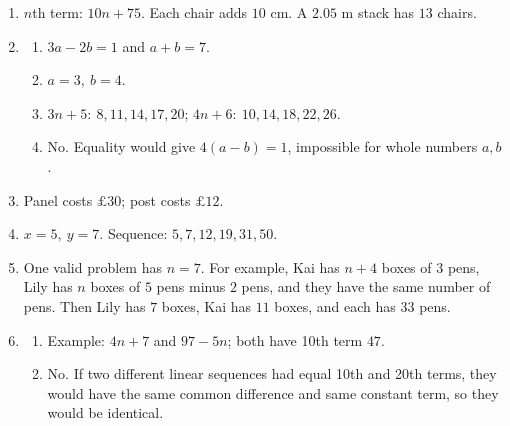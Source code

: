 \documentclass[11pt,a4paper]{article}
\begin{document}
\begin{enumerate}[leftmargin=*,label=\textbf{Q\arabic*.}]
\item \(n\)th term: \(10n+75\). Each chair adds \(10\) cm. A \(2.05\) m stack has \(13\) chairs.

\item
\begin{enumerate}[label=(\alph*)]
\item \(3a-2b=1\) and \(a+b=7\).
\item \(a=3,\ b=4\).
\item \(3n+5:\ 8,11,14,17,20\); \quad \(4n+6:\ 10,14,18,22,26\).
\item No. Equality would give \(4(a-b)=1\), impossible for whole numbers \(a,b\).
\end{enumerate}

\item Panel costs \(\pounds30\); post costs \(\pounds12\).

\item \(x=5,\ y=7\). Sequence: \(5,7,12,19,31,50\).

\item One valid problem has \(n=7\). For example, Kai has \(n+4\) boxes of \(3\) pens, Lily has \(n\) boxes of \(5\) pens minus \(2\) pens, and they have the same number of pens. Then Lily has \(7\) boxes, Kai has \(11\) boxes, and each has \(33\) pens.

\item
\begin{enumerate}[label=(\alph*)]
\item Example: \(4n+7\) and \(97-5n\); both have 10th term \(47\).
\item No. If two different linear sequences had equal 10th and 20th terms, they would have the same common difference and same constant term, so they would be identical.
\end{enumerate}

\end{enumerate}
\end{document}
